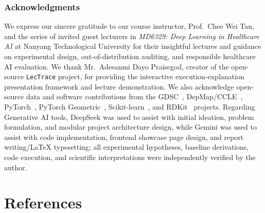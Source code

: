\documentclass{article}
\begin{document}
\subsubsection*{Acknowledgments}
We express our sincere gratitude to our course instructor, Prof.\ Chee Wei Tan, and the series of invited guest lecturers in \emph{MD6329: Deep Learning in Healthcare AI} at Nanyang Technological University for their insightful lectures and guidance on experimental design, out-of-distribution auditing, and responsible healthcare AI evaluation. We thank Mr.\ Adesanmi Dayo Praisegod, creator of the open-source \texttt{LecTrace} project, for providing the interactive execution-explanation presentation framework and lecture demonstration. We also acknowledge open-source data and software contributions from the GDSC~\cite{yang2013gdsc,iorio2016landscape}, DepMap/CCLE~\cite{tsherniak2017depmap,ghandi2019next}, PyTorch~\cite{paszke2019pytorch}, PyTorch Geometric~\cite{fey2019fast}, Scikit-learn~\cite{pedregosa2011scikit}, and RDKit~\cite{landrum2016rdkit} projects. Regarding Generative AI tools, DeepSeek was used to assist with initial ideation, problem formulation, and modular project architecture design, while Gemini was used to assist with code implementation, frontend showcase page design, and report writing/\LaTeX{} typesetting; all experimental hypotheses, baseline derivations, code execution, and scientific interpretations were independently verified by the author.

\section*{References}

\medskip
\small
\renewcommand{\section}[2]{}%
\end{document}

